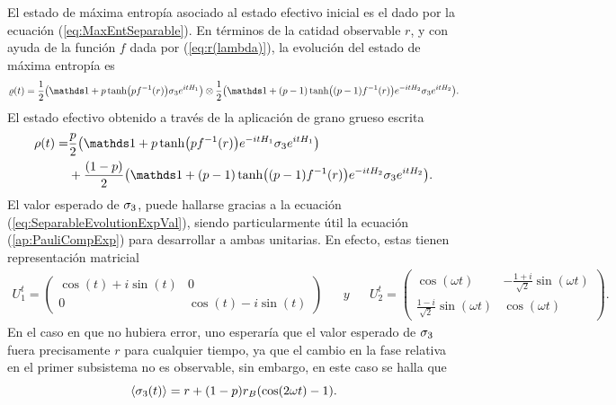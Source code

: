 El estado de máxima entropía asociado al estado efectivo inicial es el dado por la ecuación (\ref{eq:MaxEntSeparable}). En términos de la catidad observable $r$, y con ayuda de la función $f$ dada por (\ref{eq:r(lambda)}), la evolución del estado de máxima entropía es
\begin{equation*}
    \varrho(t)=\frac{1}{2}\qty(\Id+p\tanh(pf^{-1}(r))\pauli{3}e^{itH_{1}})\otimes\frac{1}{2}\qty(\Id+(p-1)\tanh((p-1)f^{-1}(r))e^{-itH_{2}}\pauli{3}e^{itH_{2}}).
\end{equation*}
El estado efectivo obtenido a través de la aplicación de grano grueso escrita
\begin{align*}
    \rho(t)=&\frac{p}{2}\qty(\Id+p\tanh(pf^{-1}(r))e^{-itH_{1}}\pauli{3}e^{itH_{1}})\\
    &+\frac{(1-p)}{2}\qty(\Id+(p-1)\tanh((p-1)f^{-1}(r))e^{-itH_{2}}\pauli{3}e^{itH_{2}}).
\end{align*}
El valor esperado de $\sigma_{3}$, puede hallarse gracias a la ecuación (\ref{eq:SeparableEvolutionExpVal}), siendo particularmente útil la ecuación (\ref{ap:PauliCompExp}) para desarrollar a ambas unitarias. En efecto, estas tienen representación matricial
\begin{align*}
    U_{1}^{t}=\begin{pmatrix}
        \cos(t)+i\sin(t) & 0\\
        0 & \cos(t)-i\sin(t)
    \end{pmatrix}& & y & & U_{2}^{t}=\begin{pmatrix}
        \cos(\omega t) &-\frac{1+i}{\sqrt{2}}\sin(\omega t) \\
        \frac{1-i}{\sqrt{2}}\sin(\omega t) & \cos(\omega t)
    \end{pmatrix}.
\end{align*}
En el caso en que no hubiera error, uno esperaría que el valor esperado de $\sigma_{3}$ fuera precisamente $r$ para cualquier tiempo, ya que el cambio en la fase relativa en el primer subsistema no es observable, sin embargo, en este caso se halla que
\begin{equation*}
    \expval{\sigma_{3}(t)}=r+(1-p)r_{B}(\cos(2\omega t)-1).
\end{equation*}
